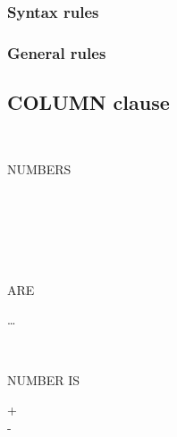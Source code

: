 \subsubsection{Syntax rules}

\subsubsection{General rules}

\subsection{COLUMN clause}

\begin{syntax}
  \begin{1=}
    \begin{1=}
       \\
    \end{1=}
    NUMBERS
    \begin{0-1}
       \\
    \end{0-1} \\

    \begin{1=}
       \\
    \end{1=}
    ARE
  \end{1=}
  \begin{1=}
    \begin{0-1}
    \end{0-1}
    \integer
  \end{1=}
  \ldots
\end{syntax}

\begin{syntax}
  \begin{1=}
     \\
  \end{1=}
  NUMBER IS
  \begin{0-1}
    + \\
    - \\
     \\
  \end{0-1}
  \begin{1=}
    \identifier \\
    \integer
  \end{1=}
\end{syntax}

